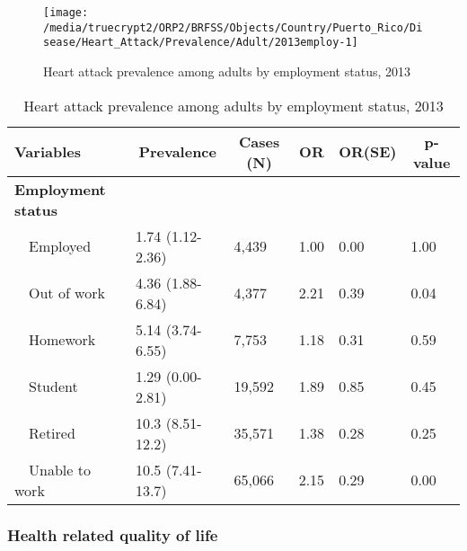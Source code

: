 \begin{figure}[H]
\caption{Heart attack prevalence among adults by employment status, 
         2013}
\label{fig:employ.Heart_Attack.2013}
\begin{knitrout}
\color{fgcolor}

{\centering \texttt{[image: /media/truecrypt2/ORP2/BRFSS/Objects/Country/Puerto\_Rico/Disease/Heart\_Attack/Prevalence/Adult/2013employ-1]} 

}



\end{knitrout}
 \end{figure}

\begin{table}[H]
\caption{Heart attack prevalence  among adults by employment status, 2013\label{tab:employ.Heart_Attack.2013}} 
\begin{center}
\begin{tabular}{llllll}
\hline\hline
\multicolumn{1}{l}{Variables}&\multicolumn{1}{c}{Prevalence}&\multicolumn{1}{c}{Cases (N)}&\multicolumn{1}{c}{OR}&\multicolumn{1}{c}{OR(SE)}&\multicolumn{1}{c}{p-value}\tabularnewline
\hline
{\bfseries Employment status}&&&&&\tabularnewline
~~Employed&1.74 (1.12-2.36)& 4,439&1.00&0.00&1.00\tabularnewline
~~Out of work&4.36 (1.88-6.84)& 4,377&2.21&0.39&0.04\tabularnewline
~~Homework&5.14 (3.74-6.55)& 7,753&1.18&0.31&0.59\tabularnewline
~~Student&1.29 (0.00-2.81)&19,592&1.89&0.85&0.45\tabularnewline
~~Retired&10.3 (8.51-12.2)&35,571&1.38&0.28&0.25\tabularnewline
~~Unable to work&10.5 (7.41-13.7)&65,066&2.15&0.29&0.00\tabularnewline
\hline
\end{tabular}\end{center}

\end{table}


 \newpage
\subsubsection{Health related quality of life}


